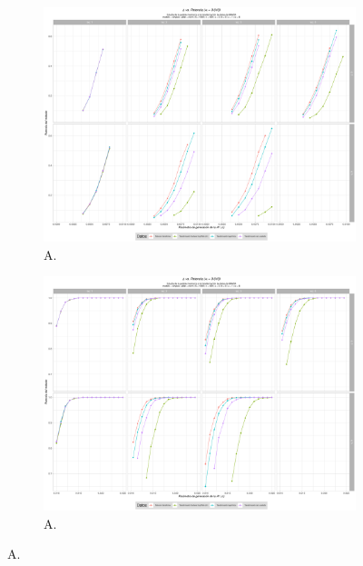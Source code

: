 \documentclass[IB,BIB]{TFUOC}%
\begin{document}
\begin{figure}[!htbp]
\hspace*{-2cm} %
\begin{subfigure}{.65\textwidth}
  \centering
  \includegraphics[width=.7\linewidth]{OBJ2SimplexMANTAqloc001ColaIzq.pdf}
  \caption{\scriptsize{A.}}
  \label{fig:OBJ2SimplexMANTAqloc001ColaIzq}
\end{subfigure}%
\begin{subfigure}{.65\textwidth}
\hspace*{-2.3cm} %
  \centering
  \includegraphics[width=.7\linewidth]{OBJ2SimplexMANTAqloc001Coladch.pdf}
  \caption{\scriptsize{A.}}
  \label{fig:OBJ2SimplexMANTAqloc001Coladch}
\end{subfigure}
\caption{\scriptsize{A.}}
\label{fig:OBJ2001zoom}
\end{figure}
\end{document}
